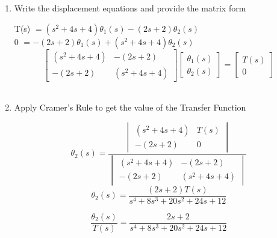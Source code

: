 ﻿\documentclass[11pt]{article}
\begin{document}
\begin{enumerate}[label=(\alph*),itemindent=*, leftmargin=*, nolistsep]
\vspace{15pt}
    \item Write the displacement equations and provide the matrix form
\begin{center}
    T(s) $= (s^2 + 4s + 4)\theta_1(s) - (2s + 2)\theta_2(s)$\\
    0 $= -(2s + 2)\theta_1(s) + (s^2 + 4s + 4)\theta_2(s)$\\
    \[
        \begin{bmatrix}
        (s^2 + 4s + 4) & -(2s + 2) \\
        -(2s + 2) & (s^2 + 4s + 4)
        \end{bmatrix}
        \begin{bmatrix}
        \theta_1(s) \\
        \theta_2(s)
        \end{bmatrix}
        =
        \begin{bmatrix}
        T(s)\\
        0
        \end{bmatrix}
    \]\\
\end{center}
\vspace{15pt}
    \item Apply Cramer's Rule to get the value of the Transfer Function
\begin{center}
    \[
        \theta_2(s) = 
            \frac{\begin{vmatrix}
                (s^2 + 4s + 4) & T(s)\\
                -(2s + 2) & 0
            \end{vmatrix}
        }{\begin{vmatrix}
                (s^2 + 4s + 4) & -(2s + 2) \\
                -(2s + 2) & (s^2 + 4s + 4)
            \end{vmatrix}
        }
    \]
    \[
    \theta_2(s) = \frac{(2s+2)T(s)}{s^4 + 8s^3 + 20s^2 + 24s + 12}
    \] 

    \[
    \boxed{\frac{\theta_2(s)}{T(s)} = \frac{2s+2}{s^4 + 8s^3 + 20s^2 + 24s + 12}}
    \] 

\end{center}
\end{enumerate}

\end{document}
